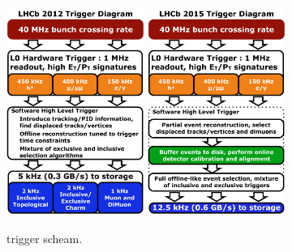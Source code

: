 \begin{figure}[t]
  \centering
  \includegraphics[width=0.4\textwidth]{Figures/Chapter2/LHCb_Trigger_RunIAlgDetail_May2015}
  \includegraphics[width=0.4\textwidth]{Figures/Chapter2/LHCb_Trigger_RunII_May2015}
  \caption{\runone trigger scheam.}
  \label{run_one_trigger}
\end{figure}
